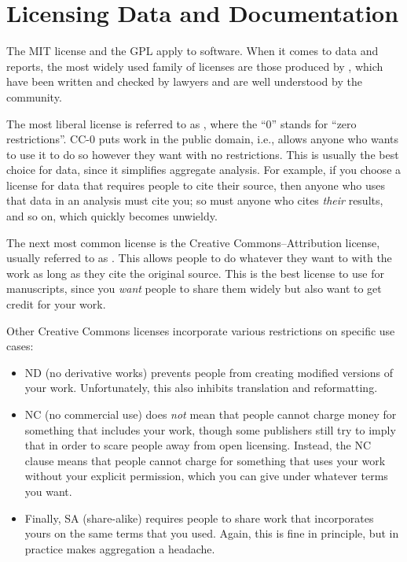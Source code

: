 \section{Licensing Data and Documentation}\label{s:collab-datadocs}

The MIT license and the GPL apply to software.
When it comes to data and reports,
the most widely used family of licenses are those produced by ,
which have been written and checked by lawyers and are well understood by the community.

The most liberal license is referred to as ,
where the ``0'' stands for ``zero restrictions''.
CC-0 puts work in the public domain,
i.e.,
allows anyone who wants to use it to do so however they want with no restrictions.
This is usually the best choice for data,
since it simplifies aggregate analysis.
For example,
if you choose a license for data that requires people to cite their source,
then anyone who uses that data in an analysis must cite you;
so must anyone who cites \emph{their} results,
and so on,
which quickly becomes unwieldy.

The next most common license is the Creative Commons--Attribution license,
usually referred to as .
This allows people to do whatever they want to with the work
as long as they cite the original source.
This is the best license to use for manuscripts,
since you \emph{want} people to share them widely
but also want to get credit for your work.

Other Creative Commons licenses incorporate various restrictions on specific use cases:

\begin{itemize}
\item
  ND (no derivative works) prevents people from creating modified versions of your work.
  Unfortunately, this also inhibits translation and reformatting.
\item
  NC (no commercial use) does \emph{not} mean that people cannot charge money for something that includes your work,
  though some publishers still try to imply that in order to scare people away from open licensing.
  Instead,
  the NC clause means that people cannot charge for something that uses your work without your explicit permission,
  which you can give under whatever terms you want.
\item
  Finally,
  SA (share-alike) requires people to share work that incorporates yours
  on the same terms that you used.
  Again,
  this is fine in principle,
  but in practice makes aggregation a headache.
\end{itemize}

